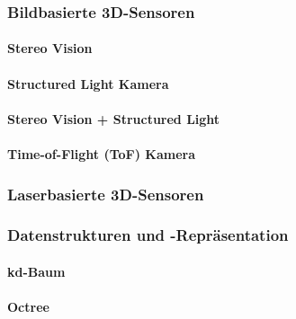 \documentclass[a4paper, 11pt, accentcolor = tud3b]{tudreport}
\begin{document}
				\subsubsection{Bildbasierte 3D-Sensoren} %

					\paragraph{Stereo Vision} %

					\paragraph{Structured Light Kamera} %

					\paragraph{Stereo Vision + Structured Light} %

					\paragraph{Time-of-Flight (ToF) Kamera} %

				\subsubsection{Laserbasierte 3D-Sensoren} %

				\subsubsection{Datenstrukturen und -Repräsentation} %

					\paragraph{kd-Baum} %

					\paragraph{Octree} %
\end{document}
